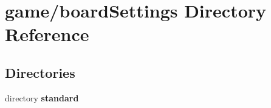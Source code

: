 \section{game/board\-Settings Directory Reference}
\label{dir_1f8d52961df16ec3895b066608b93205}
\subsection*{Directories}
\begin{DoxyCompactItemize}
\item 
directory {\bf standard}
\end{DoxyCompactItemize}
